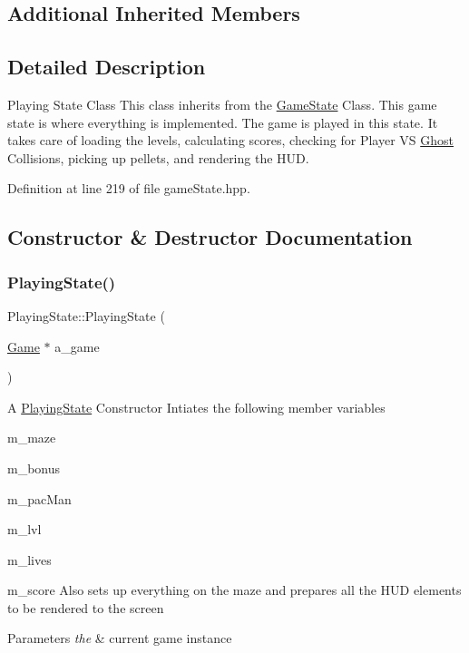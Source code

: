 \subsection*{Additional Inherited Members}


\subsection{Detailed Description}
Playing State Class This class inherits from the \hyperlink{class_game_state}{Game\+State} Class. This game state is where everything is implemented. The game is played in this state. It takes care of loading the levels, calculating scores, checking for Player VS \hyperlink{class_ghost}{Ghost} Collisions, picking up pellets, and rendering the H\+UD. 

Definition at line 219 of file game\+State.\+hpp.



\subsection{Constructor \& Destructor Documentation}
\mbox{\label{class_playing_state_a09c8d3c87687ffa4e5f04c70265d67de}} 
\subsubsection{\texorpdfstring{Playing\+State()}{PlayingState()}}
{\footnotesize\ttfamily Playing\+State\+::\+Playing\+State (\begin{DoxyParamCaption}\item[{\hyperlink{class_game}{Game} $\ast$}]{a\+\_\+game }\end{DoxyParamCaption})}

A \hyperlink{class_playing_state}{Playing\+State} Constructor Intiates the following member variables
\begin{DoxyItemize}
\item m\+\_\+maze
\item m\+\_\+bonus
\item m\+\_\+pac\+Man
\item m\+\_\+lvl
\item m\+\_\+lives
\item m\+\_\+score Also sets up everything on the maze and prepares all the H\+UD elements to be rendered to the screen 
\begin{DoxyParams}{Parameters}
{\em the} & current game instance \\
\hline
\end{DoxyParams}

\end{DoxyItemize}

